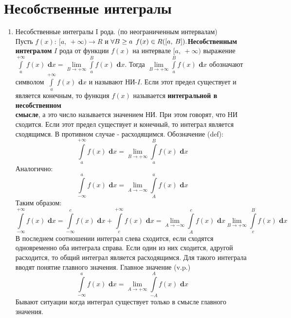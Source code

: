 \documentclass[a4paper,12pt, centered]{bookest}
\theoremstyle{remark}
\newcommand\dx{\textbf{ d}x}
\begin{document}
\section{Несобственные интегралы}
\begin{enumerate}
	\item Несобственные интегралы I рода. (по неограниченным интервалам)\\ Пусть $f(x):\>[a,\>+\infty)\to R$ и $\forall B\geq a\>\>f(x)\in R([a,\>B]).\\$\textbf{Несобственным интегралом }  $I$ рода от функции $f(x)$ на интервале $[a,\>+\infty)$ выражение $\int\limits_a^{+\infty}f(x)\dx=\lim\limits_{B\to+\infty}\int\limits_a^Bf(x)\dx$. Тогда $\lim\limits_{B\to+\infty}\int\limits_a^Bf(x)\dx$ обозначают символом $\int\limits_a^{+\infty}f(x)\dx$ и называют НИ-$I$. Если этот предел существует и является конечным, то функция $f(x)$ называется \textbf{интегральной в несобственном}\\\textbf{смысле}, а это число называется значением НИ. При этом говорят, что НИ сходится. Если этот предел существует и конечный, то интеграл является сходящимся. В противном случае - расходящимся. Обозначение (def): $$\int\limits_a^{+\infty}f(x)\dx=\lim\limits_{B\to+\infty}\int\limits_a^Bf(x)\dx$$ Аналогично: $$\int\limits^a_{-\infty}f(x)\dx=\lim\limits_{A\to-\infty}\int\limits_A^af(x)\dx$$ Таким образом: $$\int\limits^{+\infty}_{-\infty}f(x)\dx=\int\limits^{c}_{-\infty}f(x)\dx+\int\limits^{+\infty}_{c}f(x)\dx=\lim\limits_{A\to-\infty}\int\limits^{c}_{A}f(x)\dx\lim\limits_{B\to+\infty}\int\limits_{c}^{B}f(x)\dx$$ В последнем соотношении интеграл слева сходится, если сходятся одновременно оба интеграла справа. Если один из них сходится, адругой расходится, то общий интеграл является расходящимся. Для такого интеграла вводят понятие главного значения. Главное значение (v.p.) $$\int\limits^a_{-\infty}f(x)\dx=\lim\limits_{A\to+\infty}\int\limits_{-A}^Af(x)\dx$$ Бывают ситуации когда интеграл существует только в смысле главного значения. 

\end{enumerate}
\end{document}
